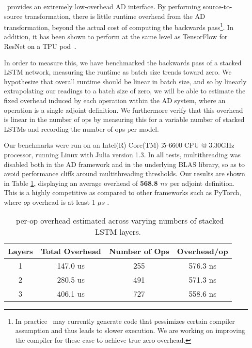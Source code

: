 \documentclass{juliacon}
\newcommand{\Zygote}{\iftoggle{anonymous}{$\partial$P.jl}{Zygote}}
\begin{document}
\Zygote\ provides an extremely low-overhead AD interface. By performing source-to-source transformation, there is little runtime overhead from the AD transformation, beyond the actual cost of computing the backwards pass\footnote{In practice \Zygote\ may currently generate code that pessimizes certain compiler assumption and thus leads to slower execution. We are working on improving the compiler for these case to achieve true zero overhead.}. In addition, it has been shown to perform at the same level as TensorFlow for ResNet on a TPU pod~\cite{xla.jl}.

In order to measure this, we have benchmarked the backwards pass of a stacked LSTM network, measuring the runtime as batch size trends toward zero. We hypothesize that overall runtime should be linear in batch size, and so by linearly extrapolating our readings to a batch size of zero, we will be able to estimate the fixed overhead induced by each operation within the AD system, where an operation is a single adjoint definition.  We furthermore verify that this overhead is linear in the number of ops by measuring this for a variable number of stacked LSTMs and recording the number of ops per model.

Our benchmarks were run on an Intel(R) Core(TM) i5-6600 CPU @ 3.30GHz processor, running Linux with Julia version 1.3.  In all tests, multithreading was disabled both in the AD framework and in the underlying BLAS library, so as to avoid performance cliffs around multithreading thresholds. Our results are shown in Table \ref{table:zygote_overhead}, displaying an average overhead of \textbf{568.8 $ns$} per adjoint definition. This is a highly competitive as compared to other frameworks such as PyTorch, where $op$ overhead is at least 1 $\mu s$ \cite{PyTorchYear}.

\begin{table}[]
\centering
\begin{tabular}{cccc}
Layers & Total Overhead & Number of Ops & Overhead/op \\ \hline
1      & 147.0 us & 255 & 576.3 ns \\
2      & 280.5 us & 491 & 571.3 ns \\ 
3      & 406.1 us & 727 & 558.6 ns \\ \hline
\end{tabular}
\label{table:zygote_overhead}
\caption{\Zygote\ per-op overhead estimated across varying numbers of stacked LSTM layers.}
\end{table}
\end{document}
